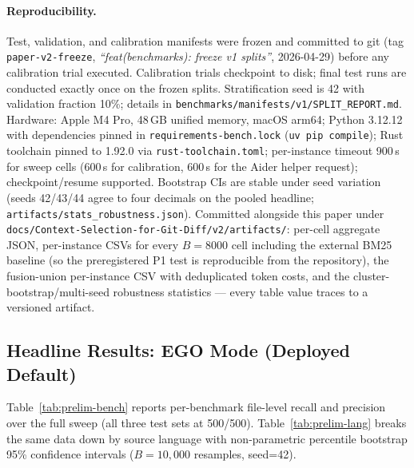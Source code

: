 \documentclass[11pt, a4paper]{article}
\begin{document}
\paragraph{Reproducibility.} Test, validation, and calibration manifests were frozen and committed to git (tag \texttt{paper-v2-freeze}, \emph{``feat(benchmarks): freeze v1 splits''}, 2026-04-29) before any calibration trial executed. Calibration trials checkpoint to disk; final test runs are conducted exactly once on the frozen splits. Stratification seed is 42 with validation fraction 10\%; details in \texttt{benchmarks/manifests/v1/SPLIT\_REPORT.md}. Hardware: Apple M4 Pro, 48\,GB unified memory, macOS arm64; Python 3.12.12 with dependencies pinned in \texttt{requirements-bench.lock} (\texttt{uv pip compile}); Rust toolchain pinned to 1.92.0 via \texttt{rust-toolchain.toml}; per-instance timeout 900\,s for sweep cells (600\,s for calibration, 600\,s for the Aider helper request); checkpoint/resume supported. Bootstrap CIs are stable under seed variation (seeds 42/43/44 agree to four decimals on the pooled headline; \texttt{artifacts/stats\_robustness.json}). Committed alongside this paper under \texttt{docs/Context-Selection-for-Git-Diff/v2/artifacts/}: per-cell aggregate JSON, per-instance CSVs for every $B{=}8000$ cell including the external BM25 baseline (so the preregistered P1 test is reproducible from the repository), the fusion-union per-instance CSV with deduplicated token costs, and the cluster-bootstrap/multi-seed robustness statistics --- every table value traces to a versioned artifact.

\subsection{Headline Results: EGO Mode (Deployed Default)}

Table~\ref{tab:prelim-bench} reports per-benchmark file-level recall and precision over the full sweep (all three test sets at 500/500). Table~\ref{tab:prelim-lang} breaks the same data down by source language with non-parametric percentile bootstrap 95\% confidence intervals ($B{=}10{,}000$ resamples, seed=42).
\end{document}
